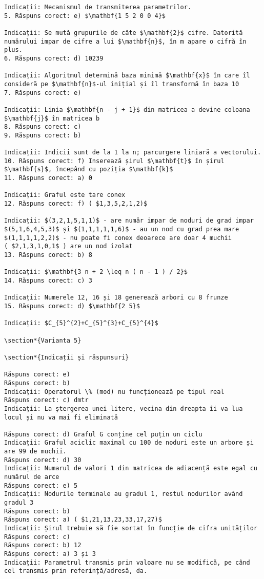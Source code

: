 \begin{verbatim}
Indicații: Mecanismul de transmiterea parametrilor.
5. Răspuns corect: e) $\mathbf{1 5 2 0 0 4}$

Indicații: Se mută grupurile de câte $\mathbf{2}$ cifre. Datorită numărului impar de cifre a lui $\mathbf{n}$, în m apare o cifră în plus.
6. Răspuns corect: d) 10239

Indicații: Algoritmul determină baza minimă $\mathbf{x}$ în care îl consideră pe $\mathbf{n}$-ul inițial și îl transformă în baza 10
7. Răspuns corect: e)

Indicații: Linia $\mathbf{n - j + 1}$ din matricea a devine coloana $\mathbf{j}$ în matricea b
8. Răspuns corect: c)
9. Răspuns corect: b)

Indicații: Indicii sunt de la 1 la n; parcurgere liniară a vectorului.
10. Răspuns corect: f) Inserează șirul $\mathbf{t}$ în șirul $\mathbf{s}$, începând cu poziția $\mathbf{k}$
11. Răspuns corect: a) 0

Indicații: Graful este tare conex
12. Răspuns corect: f) ( $1,3,5,2,1,2)$

Indicații: $(3,2,1,5,1,1)$ - are număr impar de noduri de grad impar
$(5,1,6,4,5,3)$ și $(1,1,1,1,1,6)$ - au un nod cu grad prea mare
$(1,1,1,1,2,2)$ - nu poate fi conex deoarece are doar 4 muchii
( $2,1,3,1,0,1$ ) are un nod izolat
13. Răspuns corect: b) 8

Indicații: $\mathbf{3 n + 2 \leq n ( n - 1 ) / 2}$
14. Răspuns corect: c) 3

Indicații: Numerele 12, 16 și 18 generează arbori cu 8 frunze
15. Răspuns corect: d) $\mathbf{2 5}$

Indicații: $C_{5}^{2}+C_{5}^{3}+C_{5}^{4}$

\section*{Varianta 5}

\section*{Indicații și răspunsuri}

Răspuns corect: e)
Răspuns corect: b)
Indicații: Operatorul \% (mod) nu funcționează pe tipul real
Răspuns corect: c) dmtr
Indicații: La ștergerea unei litere, vecina din dreapta îi va lua locul și nu va mai fi eliminată

Răspuns corect: d) Graful G conține cel puțin un ciclu
Indicații: Graful aciclic maximal cu 100 de noduri este un arbore și are 99 de muchii.
Răspuns corect: d) 30
Indicații: Numarul de valori 1 din matricea de adiacență este egal cu numărul de arce
Răspuns corect: e) 5
Indicații: Nodurile terminale au gradul 1, restul nodurilor având gradul 3
Răspuns corect: b)
Răspuns corect: a) ( $1,21,13,23,33,17,27)$
Indicații: Șirul trebuie să fie sortat în funcție de cifra unităților
Răspuns corect: c)
Răspuns corect: b) 12
Răspuns corect: a) 3 și 3
Indicații: Parametrul transmis prin valoare nu se modifică, pe când cel transmis prin referință/adresă, da.


\end{verbatim}
